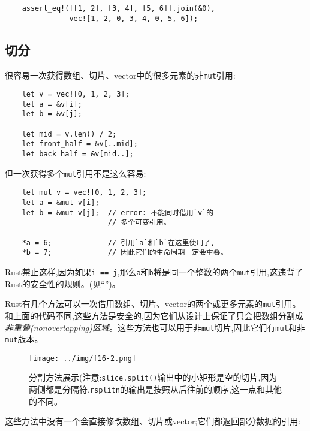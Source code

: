 \begin{verbatim}
    assert_eq!([[1, 2], [3, 4], [5, 6]].join(&0),
               vec![1, 2, 0, 3, 4, 0, 5, 6]);
\end{verbatim}

\subsection{切分}\label{split}
很容易一次获得数组、切片、vector中的很多元素的非\texttt{mut}引用:
\begin{verbatim}
    let v = vec![0, 1, 2, 3];
    let a = &v[i];
    let b = &v[j];

    let mid = v.len() / 2;
    let front_half = &v[..mid];
    let back_half = &v[mid..];
\end{verbatim}

但一次获得多个\texttt{mut}引用不是这么容易:
\begin{verbatim}
    let mut v = vec![0, 1, 2, 3];
    let a = &mut v[i];
    let b = &mut v[j];  // error: 不能同时借用`v`的
                        // 多个可变引用。

    *a = 6;             // 引用`a`和`b`在这里使用了,
    *b = 7;             // 因此它们的生命周期一定会重叠。
\end{verbatim}

Rust禁止这样,因为如果\texttt{i == j},那么\texttt{a}和\texttt{b}将是同一个整数的两个\texttt{mut}引用,这违背了Rust的安全性的规则。(见“”)。

Rust有几个方法可以一次借用数组、切片、vector的两个或更多元素的\texttt{mut}引用。和上面的代码不同,这些方法是安全的,因为它们从设计上保证了只会把数组分割成\emph{非重叠(nonoverlapping)区域}。这些方法也可以用于非\texttt{mut}切片,因此它们有\texttt{mut}和非\texttt{mut}版本。

\begin{figure}[htbp]
    \centering
    \texttt{[image: ../img/f16-2.png]}
    \caption{分割方法展示(注意:\texttt{slice.split()}输出中的小矩形是空的切片,因为两侧都是分隔符,\texttt{rsplitn}的输出是按照从后往前的顺序,这一点和其他的不同。}
    \label{f16-2}
\end{figure}

这些方法中没有一个会直接修改数组、切片或vector;它们都返回部分数据的引用:

